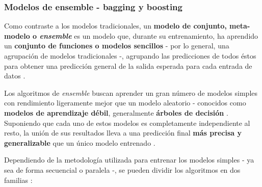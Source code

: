 \subsubsection{Modelos de ensemble - bagging y boosting}

Como contraste a los modelos tradicionales, un \textbf{modelo de conjunto, meta-modelo o \textit{ensemble}} es un modelo que, durante su entrenamiento, ha aprendido un \textbf{conjunto de funciones o modelos sencillos} - por lo general, una agrupación de modelos tradicionales -, agrupando las predicciones de todos éstos para obtener una predicción general de la salida esperada para cada entrada de datos \cite{aima}.

Los algoritmos de \textit{ensemble} buscan aprender un gran número de modelos simples con rendimiento ligeramente mejor que un modelo aleatorio - conocidos como \textbf{modelos de aprendizaje débil}, generalmente \textbf{árboles de decisión} \cite{Burkov2019TheHM}. Suponiendo que cada uno de estos modelos es completamente independiente al resto, la unión de sus resultados lleva a una predicción final \textbf{más precisa y generalizable} que un único modelo entrenado \cite{Burkov2019TheHM}.

Dependiendo de la metodología utilizada para entrenar los modelos simples - ya sea de forma secuencial o paralela -, se pueden dividir los algoritmos en dos familias \cite{aima}:



